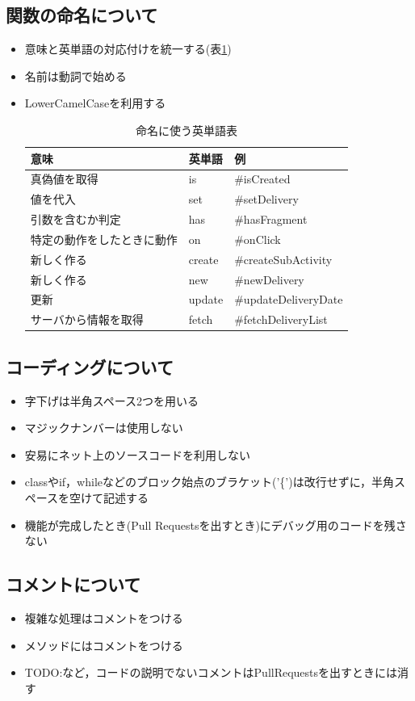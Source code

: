 \documentclass[a4j,titlepage]{jarticle}
\begin{document}
\subsection{関数の命名について}
\begin{itemize}
\item 意味と英単語の対応付けを統一する(表\ref{namingTable})
\item 名前は動詞で始める
\item LowerCamelCaseを利用する
\begin{table}[htb]
\centering
\caption{命名に使う英単語表}
\label{namingTable}
\begin{tabular}{|lll|}
\hline
意味            & 英単語    & 例                    \\ \hline
真偽値を取得        & is     & \#isCreated          \\
値を代入          & set    & \#setDelivery        \\
引数を含むか判定      & has    & \#hasFragment        \\
特定の動作をしたときに動作 & on     & \#onClick            \\
新しく作る         & create & \#createSubActivity  \\
新しく作る         & new    & \#newDelivery        \\
更新            & update & \#updateDeliveryDate \\
サーバから情報を取得    & fetch  & \#fetchDeliveryList  \\ \hline
\end{tabular}
\end{table}
\end{itemize}

\subsection{コーディングについて}
\begin{itemize}
\item 字下げは半角スペース2つを用いる
\item マジックナンバーは使用しない
\item 安易にネット上のソースコードを利用しない
\item classやif，whileなどのブロック始点のブラケット('\{')は改行せずに，半角スペースを空けて記述する
\item 機能が完成したとき(Pull Requestsを出すとき)にデバッグ用のコードを残さない
\end{itemize}

\subsection{コメントについて}
\begin{itemize}
    \item 複雑な処理はコメントをつける
    \item メソッドにはコメントをつける
    \item TODO:など，コードの説明でないコメントはPullRequestsを出すときには消す
\end{itemize}
\end{document}
